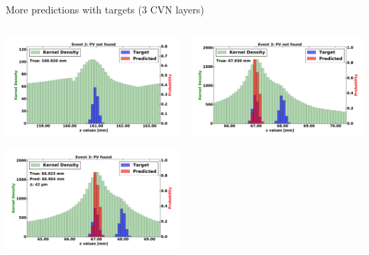 
\begin{frame}{More predictions with targets (3 CVN layers)}
  \begin{columns}[c]
        \begin{center}
            \includegraphics[width=1\textwidth,height=0.45\textwidth, trim=18 0 18 0]{images/120000_3layer_16.pdf}

            \includegraphics[width=1\textwidth, height=0.45\textwidth,trim=18 0 18 0]{images/120000_3layer_17.pdf}

        \end{center}
        \begin{center}
           \includegraphics[width=1\textwidth, height=0.45\textwidth, trim=18 0 18 0]{images/120000_3layer_18.pdf}


\end{center}
\end{columns}
\end{frame}
